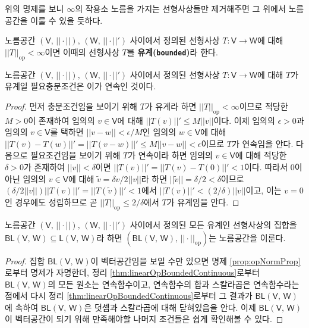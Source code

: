위의 명제를 보니 $\infty$의 작용소 노름을 가지는 선형사상들만 제거해주면 그 위에서 노름공간을 이룰 수 있을 듯하다.

\begin{definition}
    노름공간 $(\mathsf{V},\,||\cdot||),\,(\mathsf{W},\,||\cdot||')$ 사이에서 정의된 선형사상 $T:\mathsf{V}\to\mathsf{W}$에 대해 $||T||_\mathrm{op}<\infty$이면 이때의 선형사상 $T$를 \textbf{유계(\texttt{bounded})}라 한다.
\end{definition}

\begin{theorem}\label{thm:linearOpBoundedContinuous}
    노름공간 $(\mathsf{V},\,||\cdot||),\,(\mathsf{W},\,||\cdot||')$ 사이에서 정의된 선형사상 $T:\mathsf{V}\to\mathsf{W}$에 대해 $T$가 유계일 필요충분조건은 이가 연속인 것이다.
\end{theorem}

\begin{proof}
    먼저 충분조건임을 보이기 위해 $T$가 유계라 하면 $||T||_\mathrm{op}<\infty$이므로 적당한 $M>0$이 존재하여 임의의 $v\in\mathsf{V}$에 대해 $||T(v)||'\leq M||v||$이다. 이제 임의의 $\epsilon>0$과 임의의 $v\in\mathsf{V}$를 택하면 $||v-w||<\epsilon/M$인 임의의 $w\in\mathsf{V}$에 대해 $||T(v)-T(w)||'=||T(v-w)||'\leq M||v-w||<\epsilon$이므로 $T$가 연속임을 안다. 다음으로 필요조건임을 보이기 위해 $T$가 연속이라 하면 임의의 $v\in\mathsf{V}$에 대해 적당한 $\delta>0$가 존재하여 $||v||<\delta$이면 $||T(v)||'=||T(v)-T(0)||'<1$이다. 따라서 $0$이 아닌 임의의 $v\in\mathsf{V}$에 대해 $\widetilde{v}=\delta v/2||v||$라 하면 $||\widetilde{v}||=\delta/2<\delta$이므로 $(\delta/2||v||)||T(v)||'=||T(\widetilde{v})||'<1$에서 $||T(v)||'<(2/\delta)||v||$이고, 이는 $v=0$인 경우에도 성립하므로 곧 $||T||_\mathrm{op}\leq2/\delta$에서 $T$가 유계임을 안다.
\end{proof}

\begin{proposition}\label{prop:boundedLinearMapNormSpace}
    노름공간 $(\mathsf{V},\,||\cdot||),\,(\mathsf{W},\,||\cdot||')$ 사이에서 정의된 모든 유계인 선형사상의 집합을 $\mathsf{BL}(\mathsf{V},\,\mathsf{W})\subseteq\mathsf{L}(\mathsf{V},\,\mathsf{W})$라 하면 $(\mathsf{BL}(\mathsf{V},\,\mathsf{W}),\,||\cdot||_\mathrm{op})$는 노름공간을 이룬다.
\end{proposition}

\begin{proof}
    집합 $\mathsf{BL}(\mathsf{V},\,\mathsf{W})$이 벡터공간임을 보일 수만 있으면 명제 \ref{prop:opNormProp}로부터 명제가 자명한데, 정리 \ref{thm:linearOpBoundedContinuous}로부터 $\mathsf{BL}(\mathsf{V},\,\mathsf{W})$의 모든 원소는 연속함수이고, 연속함수의 합과 스칼라곱은 연속함수라는 점에서 다시 정리 \ref{thm:linearOpBoundedContinuous}로부터 그 결과가 $\mathsf{BL}(\mathsf{V},\,\mathsf{W})$에 속하여 $\mathsf{BL}(\mathsf{V},\,\mathsf{W})$은 덧셈과 스칼라곱에 대해 닫혀있음을 안다. 이제 $\mathsf{BL}(\mathsf{V},\,\mathsf{W})$이 벡터공간이 되기 위해 만족해야할 나머지 조건들은 쉽게 확인해볼 수 있다.
\end{proof}

